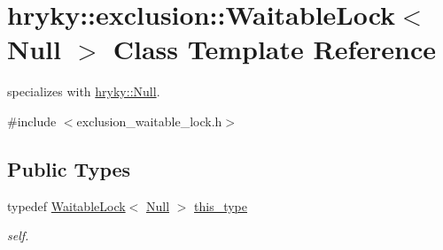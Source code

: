 \hypertarget{classhryky_1_1exclusion_1_1_waitable_lock_3_01_null_01_4}{\section{hryky\-:\-:exclusion\-:\-:Waitable\-Lock$<$ Null $>$ Class Template Reference}
\label{classhryky_1_1exclusion_1_1_waitable_lock_3_01_null_01_4}
}


specializes with \hyperlink{classhryky_1_1_null}{hryky\-::\-Null}.  




{\ttfamily \#include $<$exclusion\-\_\-waitable\-\_\-lock.\-h$>$}

\subsection*{Public Types}
\begin{DoxyCompactItemize}
\item 
\hypertarget{classhryky_1_1exclusion_1_1_waitable_lock_3_01_null_01_4_a1c0e5189f19c3cd9ee43c1b0b76f1e25}{typedef \hyperlink{classhryky_1_1exclusion_1_1_waitable_lock}{Waitable\-Lock}$<$ \hyperlink{classhryky_1_1_null}{Null} $>$ \hyperlink{classhryky_1_1exclusion_1_1_waitable_lock_3_01_null_01_4_a1c0e5189f19c3cd9ee43c1b0b76f1e25}{this\-\_\-type}}\label{classhryky_1_1exclusion_1_1_waitable_lock_3_01_null_01_4_a1c0e5189f19c3cd9ee43c1b0b76f1e25}

\begin{DoxyCompactList}\small\item\em self. \end{DoxyCompactList}\end{DoxyCompactItemize}
